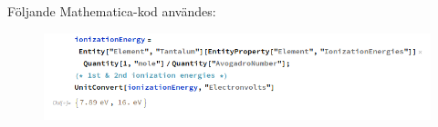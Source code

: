 
\usepackage{pdfpages}
\usepackage{incgraph}



	
\newpage

Följande Mathematica-kod användes:
\begin{figure}[H]
	\includegraphics[width=\textwidth]{Q3_Mathematica.png}
\end{figure}
\newpage





